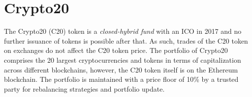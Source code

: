\section{Crypto20}

The Crypto20 (C20) token is a  \textit{closed-hybrid fund} \cite{schwartzkopff2017crypto20} with an ICO in 2017 and no further issuance of tokens is possible after that. As such, trades of the C20 token on exchanges do not affect the C20 token price. The portfolio of Crypto20 comprises the 20 largest cryptocurrencies and tokens in terms of capitalization across different blockchains, however, the C20 token itself is on the Ethereum blockchain. The portfolio is maintained with a price floor of 10\% by a trusted party for rebalancing strategies and portfolio update.